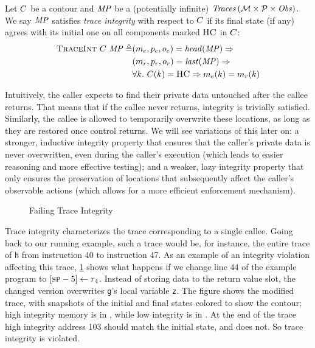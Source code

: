 \documentclass[acmsmall,review,anonymous]{acmart}\settopmatter{printfolios=true,printccs=false,printacmref=false}
\begin{document}
{Let \(C\) be a contour and \(\mathit{MP}\) be a (potentially infinite)
\(\mathit{Traces}\,({\mathcal M} \times \mathcal{P} \times \mathit{Obs})\). We say \(\mathit{MP}\) satisfies {\em trace integrity} with
respect to \(C\) if its final state (if any) agrees with its
initial one on all components marked \(\textsc{HC}\) in \(C\):
%
\[\begin{split}
  \text{\sc TraceInt} ~ C ~ \mathit{MP} \triangleq &
    (m_e,p_e,o_e) = \mathit{head}(\mathit{MP}) \Rightarrow \\
  & (m_r,p_r,o_r) = \mathit{last}(\mathit{MP}) \Rightarrow \\
  & \forall k. ~ C(k) = \textsc{HC} \Rightarrow
    m_e(k) = m_r(k) \\
\end{split}\]

Intuitively, the caller expects to find their private data untouched
after the callee returns. That means that if the callee never returns,
integrity is trivially satisfied. Similarly, the callee is allowed to
temporarily overwrite these locations, as long as they are restored
once control returns. We will see variations of this later on: a
stronger, inductive integrity property that ensures that the caller's
private data is never overwritten, even during the caller's execution
(which leads to easier reasoning and more effective testing);
and a weaker, lazy integrity property that only ensures the preservation
of locations that subsequently affect the caller's observable actions
(which allows for a more efficient enforcement mechanism).

\begin{figure}
  \integrityexample
  \caption{Failing Trace Integrity}
  \label{fig:intex}
\end{figure}

Trace integrity characterizes the trace corresponding to a single
callee.
Going back to our running example, such a trace would be, for
instance, the entire trace of {\tt h} from instruction 40 to
instruction 47.
As an example of an integrity violation affecting this trace, \cref{fig:intex} shows what happens
if we change line 44 of the example program to $[\textsc{sp} - 5] \leftarrow r_4$.
Instead of storing data to the return value slot,
the changed version overwrites {\tt g}'s local variable {\tt z}.
The figure shows the modified trace, with snapshots of the initial
and final states colored to show the contour; high
integrity memory is in \high, while low integrity is in \low.
At the end of the trace high integrity address 103 should match the initial
state, and does not. So trace integrity is violated.

}
\end{document}
